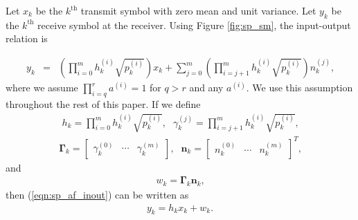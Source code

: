 Let $x_k$ be the $k^{\mbox{th}}$ transmit symbol with zero mean and unit variance.  Let $y_k$  be the $k^{\mbox{th}}$ receive symbol at the receiver.  Using Figure \ref{fig:sp_sm}, the input-output relation is


\begin{eqnarray}
y_k & = & \left( \prod_{i=0}^m h_k^{(i)} \sqrt{p_k^{(i)}}  \right) x_k + \sum_{j=0}^m 
\left( \prod_{i=j+1}^m h_k^{(i)} \sqrt{p_k^{(i)}}  \right) n_k^{(j)} \mbox{,}
\label{eqn:sp_af_inout}
\end{eqnarray}
where we assume $\prod_{i=q}^{r} a^{(i)} = 1$ for $q > r$ and any $a^{(i)}$.  We use this assumption throughout the rest of this paper.
If we define
\begin{eqnarray}
h_k = \displaystyle\prod_{i=0}^m  h_k^{(i)} \sqrt{p_k^{(i)}}
\mbox{,} & 
\gamma_k^{(j)} = \displaystyle\prod_{i=j+1}^m h_k^{(i)}  \sqrt{p_k^{(i)}}
\mbox{,}
\label{eqn:sp_af_hk_gammak}
\end{eqnarray}
\begin{eqnarray}
\mathbf{\Gamma}_k = \left[
\begin{array}{ccc}
\gamma_k^{(0)} & \cdots & \gamma_k^{(m)}
\end{array}
\right]
\mbox{,} &
\mathbf{n}_k = \left[
\begin{array}{ccc}
n_k^{(0)} & \cdots & n_k^{(m)}
\end{array} \right]^T\mbox{,}
\label{eqn:sp_af_Gammak_nk}
\end{eqnarray}
and
\begin{eqnarray}
w_k = \mathbf{\Gamma}_k \mathbf{n}_k \mbox{,} 
\label{eqn:sp_af_wk}
\end{eqnarray}
then (\ref{eqn:sp_af_inout}) can be written as
\begin{eqnarray}
y_k = h_k x_k + w_k \mbox{.}
\label{eqn:sp_af_inout_terse}
\end{eqnarray}

